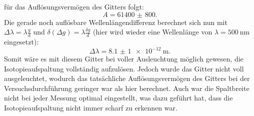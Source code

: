für das Auflösungsvermögen des Gitters folgt:
\begin{equation*}
    A = \num{61400(800)} .
\end{equation*} Die gerade noch auflösbare Wellenlängendifferenz berechnet sich nun mit $\Delta \lambda = \lambda \frac{g}{d}$ und $\delta (\Delta g) = \lambda \frac{\delta g}{d}$
(hier wird wieder eine Wellenlänge von $\lambda = \SI{500}{\nano \meter}$ eingesetzt):
\begin{equation*}
    \Delta \lambda = \SI{8,1(1)e-12}{\meter} .
\end{equation*} Somit wäre es mit diesem Gitter bei voller Ausleuchtung möglich gewesen, die Isotopieaufspaltung vollständig aufzulösen.
Jedoch wurde das Gitter nicht voll ausgeleuchtet, wodurch das tatsächliche Auflösungsvermögen des Gitters bei der Versuchsdurchführung geringer war
als hier berechnet. Auch war die Spaltbreite nicht bei jeder Messung optimal eingestellt, was dazu geführt  hat,
dass die Isotopieaufspaltung nicht immer scharf zu erkennen war.